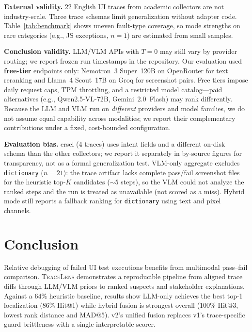 \documentclass[sigconf,nonacm]{acmart}
\begin{document}
\textbf{External validity.}
22 English UI traces from academic collectors are not industry-scale.
Three trace schemas limit generalization without adapter code.
Table~\ref{tab:benchmark} shows uneven fault-type coverage, so mode strengths on rare categories (e.g., JS exceptions, $n{=}1$) are estimated from small samples.

\textbf{Conclusion validity.}
LLM/VLM APIs with $T{=}0$ may still vary by provider routing; we report frozen run timestamps in the repository.
Our evaluation used \textbf{free-tier} endpoints only: Nemotron~3 Super~120B on OpenRouter for text reranking and Llama~4 Scout~17B on Groq for screenshot pairs.
Free tiers impose daily request caps, TPM throttling, and a restricted model catalog---paid alternatives (e.g., Qwen2.5-VL-72B, Gemini~2.0~Flash) may rank differently.
Because the LLM and VLM run on \emph{different} providers and model families, we do not assume equal capability across modalities; we report their complementary contributions under a fixed, cost-bounded configuration.

\textbf{Evaluation bias.}
ersel (4 traces) uses intent fields and a different on-disk schema than the other collectors; we report it separately in by-source figures for transparency, not as a formal generalization test.
VLM-only aggregate excludes \texttt{dictionary} ($n{=}21$): the trace artifact lacks complete pass/fail screenshot files for the heuristic top-$K$ candidates (${\sim}5$ steps), so the VLM could not analyze the ranked steps and the run is treated as unavailable (not scored as a miss).
Hybrid mode still reports a fallback ranking for \texttt{dictionary} using text and pixel channels.

\section{Conclusion}
\label{sec:conclusion}

Relative debugging of failed UI test executions benefits from multimodal pass--fail comparison.
\textsc{TraceLens} demonstrates a reproducible pipeline from aligned trace diffs through LLM/VLM priors to ranked suspects and stakeholder explanations.
Against a 64\% heuristic baseline, results show LLM-only achieves the best top-1 localization (86\% Hit@1) while hybrid fusion is strongest overall (100\% Hit@3, lowest rank distance and MAD@5).
v2's unified fusion replaces v1's trace-specific guard brittleness with a single interpretable scorer.
\end{document}

